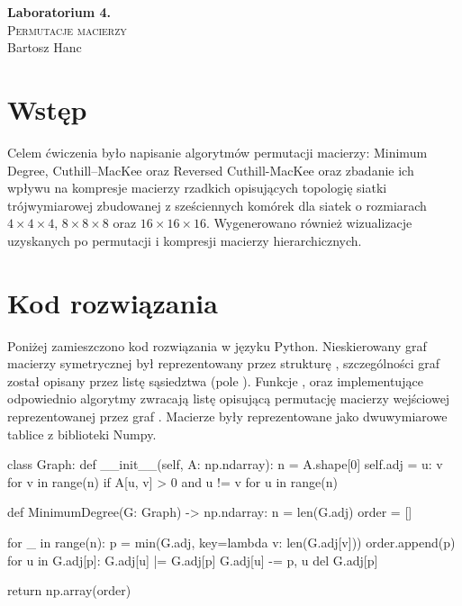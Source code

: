 \documentclass{../myclass}
\begin{document}
\begin{center}
    \Large \textbf{Laboratorium 4.}\\
    \large
    \textsc{Permutacje macierzy}\\
    \normalsize
    Bartosz Hanc
\end{center}

\section{Wstęp}

Celem ćwiczenia było napisanie algorytmów permutacji macierzy: Minimum Degree, Cuthill--MacKee oraz
Reversed Cuthill-MacKee oraz zbadanie ich wpływu na kompresje macierzy rzadkich opisujących
topologię siatki trójwymiarowej zbudowanej z sześciennych komórek dla siatek o rozmiarach \(4\times
4\times 4\), \(8 \times 8 \times 8\) oraz \(16\times16\times16\). Wygenerowano również wizualizacje
uzyskanych po permutacji i kompresji macierzy hierarchicznych.

\section{Kod rozwiązania}

Poniżej zamieszczono kod rozwiązania w języku Python. Nieskierowany graf macierzy symetrycznej był
reprezentowany przez strukturę , szczególności graf został opisany przez listę
sąsiedztwa (pole ). Funkcje ,
 oraz 
implementujące odpowiednio algorytmy zwracają listę opisującą permutację macierzy wejściowej
reprezentowanej przez graf . Macierze były reprezentowane jako dwuwymiarowe tablice
z biblioteki Numpy.

\begin{python}
class Graph:
    def __init__(self, A: np.ndarray):
        n = A.shape[0]
        self.adj = {u: {v for v in range(n) if A[u, v] > 0 and u != v} 
                    for u in range(n)}
\end{python}

\begin{python}
def MinimumDegree(G: Graph) -> np.ndarray:
    n = len(G.adj)
    order = []

    for _ in range(n):
        p = min(G.adj, key=lambda v: len(G.adj[v]))
        order.append(p)
        for u in G.adj[p]:
            G.adj[u] |= G.adj[p]
            G.adj[u] -= {p, u}
        del G.adj[p]

    return np.array(order)
\end{python}
\end{document}
